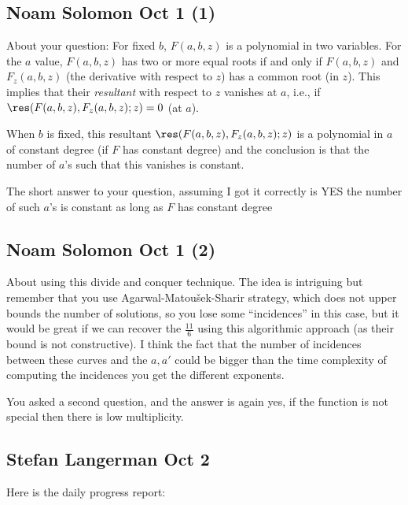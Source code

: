 \subsection{Noam Solomon Oct 1 (1)}
About your question:
For fixed \(b\), \(F(a,b,z)\) is a polynomial in two variables. For the $a$ value,
\(F(a,b,z)\) has two or more equal roots if and only if \(F(a,b,z)\) and
\(F_z(a,b,z)\)
(the derivative with respect to \(z\)) has a common root (in \(z\)). This implies
that their \emph{resultant} with respect to \(z\) vanishes at \(a\), i.e., if
\(\res(F(a,b,z),F_z(a,b,z);z)=0\) (at $a$).

When $b$ is fixed, this resultant \(\res(F(a,b,z), F_z(a,b,z);z)\) is a polynomial
in $a$ of constant degree (if \(F\) has constant degree) and the conclusion is
that the number of \(a\)'s such that this vanishes is constant.

The short answer to your question, assuming I got it correctly is YES the
number of such $a$'s is constant as long as $F$ has constant degree

\subsection{Noam Solomon Oct 1 (2)}
About using this divide and
conquer technique.
The idea is intriguing but remember that you use Agarwal-Matou\v{s}ek-Sharir
strategy, which does not upper bounds the number of solutions, so you lose
some ``incidences'' in this case, but it would be great if we can recover
the $\frac{11}{6}$ using this algorithmic approach (as their bound is not
constructive).
I think the fact that the number of incidences between these curves and the
$a,a'$ could be bigger than the time complexity of computing the incidences
you get the different exponents.

You asked a second question, and the answer is again yes, if the function
is not special then there is low multiplicity.

\subsection{Stefan Langerman Oct 2}
Here is the daily progress report:

